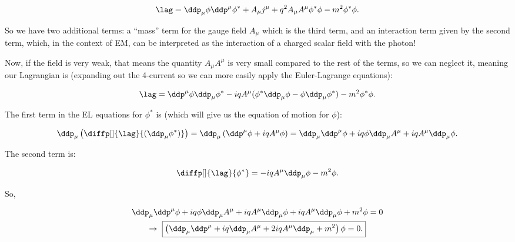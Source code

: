 \begin{parts}
\begin{equation*}
    \lag = \ddp_{\mu}\phi\ddp^{\mu}\phi^* + A_{\mu}j^{\mu} + q^2A_{\mu}A^{\mu}\phi^*\phi - m^2\phi^*\phi.
\end{equation*}

So we have two additional terms: a ``mass'' term for the gauge field $A_{\mu}$ which is the third term, and an interaction term given by the second term, which, in the context of EM, can be interpreted as the interaction of a charged scalar field with the photon!




\item Now, if the field is very weak, that means the quantity $A_{\mu}A^{\mu}$ is very small compared to the rest of the terms, so we can neglect it, meaning our Lagrangian is (expanding out the 4-current so we can more easily apply the Euler-Lagrange equations):

\begin{equation*}
    \lag = \ddp^{\mu}\phi\ddp_{\mu}\phi^* -iqA^{\mu}(\phi^*\ddp_{\mu}\phi - \phi\ddp_{\mu}\phi^*) - m^2\phi^*\phi.
\end{equation*}

The first term in the EL equations for $\phi^*$ is (which will give us the equation of motion for $\phi$):

\begin{equation*}
    \ddp_{\mu}\left( \diffp[]{\lag}{(\ddp_{\mu}\phi^*)} \right) = \ddp_{\mu} \left( \ddp^{\mu}\phi + iqA^{\mu}\phi \right) = \ddp_{\mu}\ddp^{\mu}\phi + iq\phi\ddp_{\mu}A^{\mu} + iqA^{\mu}\ddp_{\mu}\phi.
\end{equation*}

The second term is:

\begin{equation*}
    \diffp[]{\lag}{{\phi^*}} = - iqA^{\mu}\ddp_{\mu}\phi -m^2 \phi.
\end{equation*}

So,

\begin{gather*}
    \ddp_{\mu}\ddp^{\mu}\phi + iq\phi\ddp_{\mu}A^{\mu} + iqA^{\mu}\ddp_{\mu}\phi + iqA^{\mu}\ddp_{\mu}\phi + m^2 \phi = 0 \\
    \rightarrow \ \boxed{\left( \ddp_{\mu}\ddp^{\mu} + iq\ddp_{\mu}A^{\mu} + 2iqA^{\mu}\ddp_{\mu} + m^2 \right)\phi = 0.}
\end{gather*}




\end{parts}

